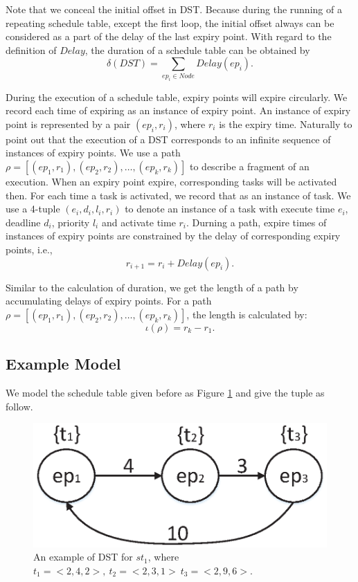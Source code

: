 \documentclass[sigconf]{acmart}
\begin{document}
Note that we conceal the initial offset in DST. Because during the running of a repeating schedule table, except the first loop, the initial offset always can be considered as a part of the delay of the last expiry point. With regard to the definition of $Delay$, the duration of a schedule table can be obtained by 
\[\delta(DST)=\sum\limits_{ep_i\in Node}Delay(ep_i).\]

During the execution of a schedule table, expiry points will expire circularly. We record each time of expiring as an instance of expiry point. An instance of expiry point is represented by a pair $(ep_i,r_i)$, where $r_i$ is the expiry time. 
Naturally to point out that the execution of a DST corresponds to an infinite sequence of instances of expiry points. 
We use a path $\rho=[(ep_1,r_1),(ep_2,r_2),\dots,(ep_k,r_k)]$ to describe a fragment of an execution. When an expiry point expire, corresponding tasks will be activated then. For each time a task is activated, we record that as an instance of task. We use a 4-tuple $(e_i,d_i,l_i,r_i)$ to denote an instance of a task with execute time $e_i$, deadline $d_i$, priority $l_i$ and activate time $r_i$. Durning a path, expire times of instances of expiry points are constrained by the delay of corresponding expiry points, i.e., 
\[r_{i+1}=r_i+Delay(ep_i).\]

Similar to the calculation of duration, we get the length of a path by accumulating delays of expiry points. For a path $\rho=[(ep_1,r_1),(ep_2,r_2),\dots,(ep_k,r_k)]$, the length is calculated by: \[\iota(\rho)=r_k-r_1.\]


\subsection{Example Model}\label{section_dst_1}
We model the schedule table given before as Figure \ref{figure_dst1} and give the tuple as follow.
\begin{figure}
  \centering
  \includegraphics[scale=.4]{graphics/figure_dst1.eps}
  \caption{An example of DST for $st_1$, where $t_1=<2,4,2>,\ t_2=<2,3,1>\ t_3=<2,9,6>$.}
  \label{figure_dst1}
\end{figure}
\end{document}
